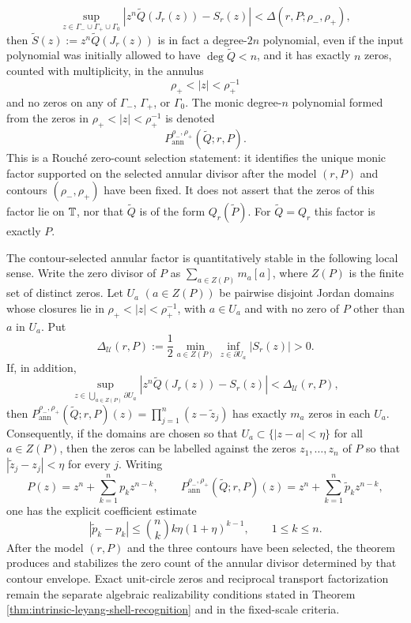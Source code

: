 \begin{theorem}
\[
\sup_{z\in\Gamma_-\cup\Gamma_+\cup\Gamma_0}
\left|z^n\widetilde Q(J_r(z))-S_r(z)\right|<\Delta(r,P;\rho_-,\rho_+),
\]
then \(\widetilde S(z):=z^n\widetilde Q(J_r(z))\) is in fact a degree-\(2n\) polynomial, even if the input polynomial was initially allowed to have \(\deg\widetilde Q<n\), and it has exactly \(n\) zeros, counted with multiplicity, in the annulus
\[
\rho_+<|z|<\rho_+^{-1}
\]
and no zeros on any of \(\Gamma_-\), \(\Gamma_+\), or \(\Gamma_0\).  The monic degree-\(n\) polynomial formed from the zeros in \(\rho_+<|z|<\rho_+^{-1}\) is denoted
\[
P_{\mathrm{ann}}^{\rho_-,\rho_+}(\widetilde Q;r,P).
\]
This is a Rouch\'e zero-count selection statement: it identifies the unique monic factor supported on the selected annular divisor after the model \((r,P)\) and contours \((\rho_-,\rho_+)\) have been fixed.  It does not assert that the zeros of this factor lie on \(\mathbb{T}\), nor that \(\widetilde Q\) is of the form \(Q_r(\widetilde P)\).  For \(\widetilde Q=Q_r\) this factor is exactly \(P\).

The contour-selected annular factor is quantitatively stable in the following local sense.  Write the zero divisor of \(P\) as \(\sum_{a\in Z(P)}m_a[a]\), where \(Z(P)\) is the finite set of distinct zeros.  Let \(U_a\) \((a\in Z(P))\) be pairwise disjoint Jordan domains whose closures lie in \(\rho_+<|z|<\rho_+^{-1}\), with \(a\in U_a\) and with no zero of \(P\) other than \(a\) in \(U_a\).  Put
\[
\Delta_{\mathcal U}(r,P)
:=\frac12\min_{a\in Z(P)}\inf_{z\in\partial U_a}|S_r(z)|>0.
\]
If, in addition,
\[
\sup_{z\in\bigcup_{a\in Z(P)}\partial U_a}
\left|z^n\widetilde Q(J_r(z))-S_r(z)\right|<\Delta_{\mathcal U}(r,P),
\]
then \(P_{\mathrm{ann}}^{\rho_-,\rho_+}(\widetilde Q;r,P)(z)=\prod_{j=1}^{n}(z-\widetilde z_j)\) has exactly \(m_a\) zeros in each \(U_a\).  Consequently, if the domains are chosen so that \(U_a\subset\{|z-a|<\eta\}\) for all \(a\in Z(P)\), then the zeros can be labelled against the zeros \(z_1,\dots,z_n\) of \(P\) so that \(|\widetilde z_j-z_j|<\eta\) for every \(j\).  Writing
\[
P(z)=z^n+\sum_{k=1}^{n}p_k z^{n-k},
\qquad
P_{\mathrm{ann}}^{\rho_-,\rho_+}(\widetilde Q;r,P)(z)=z^n+\sum_{k=1}^{n}\widetilde p_k z^{n-k},
\]
one has the explicit coefficient estimate
\[
|\widetilde p_k-p_k|
\le \binom{n}{k}k\eta(1+\eta)^{k-1},
\qquad 1\le k\le n.
\]
After the model \((r,P)\) and the three contours have been selected, the theorem produces and stabilizes the zero count of the annular divisor determined by that contour envelope.  Exact unit-circle zeros and reciprocal transport factorization remain the separate algebraic realizability conditions stated in Theorem \ref{thm:intrinsic-leyang-shell-recognition} and in the fixed-scale criteria.
\end{theorem}

